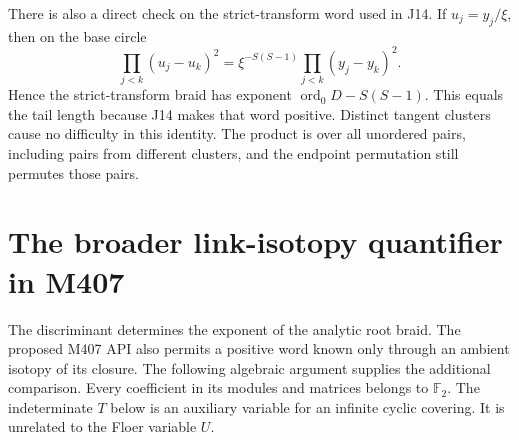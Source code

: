 \documentclass[11pt,oneside]{report}
\theoremstyle{definition}
\numberwithin{equation}{section}
\newcommand{\ord}{\operatorname{ord}}
\begin{document}
There is also a direct check on the strict-transform word used in J14.
If $u_j=y_j/\xi$, then on the base circle
\[
 \prod_{j<k}(u_j-u_k)^2
   =\xi^{-S(S-1)}\prod_{j<k}(y_j-y_k)^2.
\]
Hence the strict-transform braid has exponent
$\ord_0D-S(S-1)$. This equals the tail length because J14 makes that
word positive. Distinct tangent clusters cause no difficulty in this
identity. The product is over all unordered pairs, including pairs from
different clusters, and the endpoint permutation still permutes those
pairs.

\section{The broader link-isotopy quantifier in M407}
\label{J15:sec:fulltwist-invariant}

The discriminant determines the exponent of the analytic root braid.
The proposed M407 API also permits a positive word known only through
an ambient isotopy of its closure. The following algebraic argument
supplies the additional comparison. Every coefficient in its modules
and matrices belongs to $\mathbb F_2$. The indeterminate $T$ below is
an auxiliary variable for an infinite cyclic covering. It is unrelated
to the Floer variable $U$.
\end{document}
